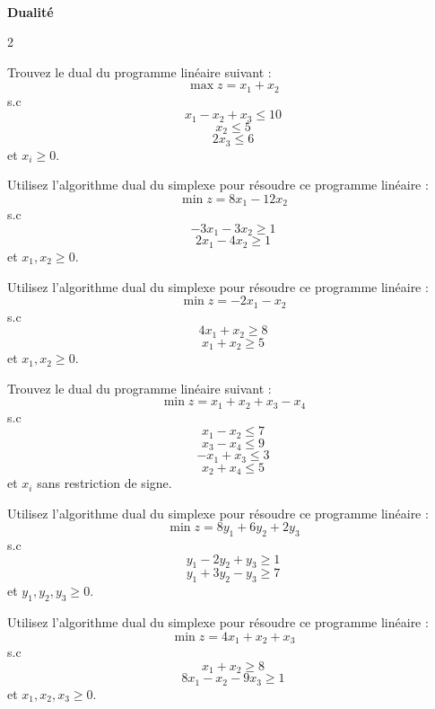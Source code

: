 \quad\\
\begin{center}
\textbf{{\large Dualité}}
\end{center}
\begin{multicols}{2}

\begin{exercice}
	Trouvez le dual du programme linéaire suivant :
	\[
	\max z = x_{1} + x_{2}
	\]
	s.c
	\[
	x_{1} - x_{2} + x_{3} \leqslant 10
	\]
	\[
	x_{2} \leqslant 5
	\]
	\[
	2x_{3} \leqslant 6
	\]
	et $x_{i} \geqslant 0$.
\end{exercice}

\begin{exercice}
	Utilisez l'algorithme dual du simplexe pour résoudre ce programme linéaire :
	\[
	\min z = 8x_{1} - 12x_{2}
	\]
	s.c
	\[
	-3x_{1} - 3x_{2} \geqslant 1
	\]
	\[
	2x_{1} - 4x_{2} \geqslant 1
	\]
	et $x_{1}, x_{2} \geqslant 0$.
\end{exercice}

\begin{exercice}
	Utilisez l'algorithme dual du simplexe pour résoudre ce programme linéaire :
	\[
	\min z = -2x_{1} - x_{2}
	\]
	s.c
	\[
	4x_{1} + x_{2} \geqslant 8
	\]
	\[
	x_{1} + x_{2} \geqslant 5
	\]
	et $x_{1}, x_{2} \geqslant 0$.
\end{exercice}

\begin{exercice}
	Trouvez le dual du programme linéaire suivant :
	\[
	\min z = x_{1} + x_{2} + x_{3} - x_{4}
	\]
	s.c
	\[
	x_{1} - x_{2} \leqslant 7
	\]
	\[
	x_{3} - x_{4} \leqslant 9
	\]
	\[
	-x_{1} + x_{3} \leqslant 3
	\]
	\[
	x_{2} + x_{4} \leqslant 5
	\]
	et $x_{i}$ sans restriction de signe.
\end{exercice}

\begin{exercice}
	Utilisez l'algorithme dual du simplexe pour résoudre ce programme linéaire :
	\[
	\min z = 8y_{1} + 6y_{2} + 2y_{3}
	\]
	s.c
	\[
	y_{1} - 2y_{2} + y_{3} \geqslant 1
	\]
	\[
	y_{1} + 3y_{2} - y_{3} \geqslant 7
	\]
	et $y_{1}, y_{2}, y_{3} \geqslant 0$.
\end{exercice}

\begin{exercice}
	Utilisez l'algorithme dual du simplexe pour résoudre ce programme linéaire :
	\[
	\min z = 4x_{1} + x_{2} + x_{3}
	\]
	s.c
	\[
	x_{1} + x_{2} \geqslant 8
	\]
	\[
	8x_{1} - x_{2} - 9x_{3} \geqslant 1
	\]
	et $x_{1}, x_{2}, x_{3} \geqslant 0$.
\end{exercice}

\end{multicols}
